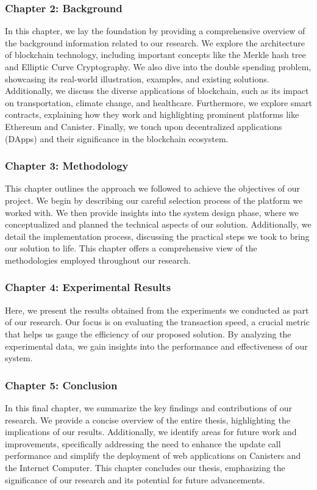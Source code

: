 \subsubsection{Chapter 2: Background}
In this chapter, we lay the foundation by providing a comprehensive overview of the background information related to our research. We explore the architecture of blockchain technology, including important concepts like the Merkle hash tree and Elliptic Curve Cryptography. We also dive into the double spending problem, showcasing its real-world illustration, examples, and existing solutions. Additionally, we discuss the diverse applications of blockchain, such as its impact on transportation, climate change, and healthcare. Furthermore, we explore smart contracts, explaining how they work and highlighting prominent platforms like Ethereum and Canister. Finally, we touch upon decentralized applications (DApps) and their significance in the blockchain ecosystem.

\subsubsection{Chapter 3: Methodology}
This chapter outlines the approach we followed to achieve the objectives of our project. We begin by describing our careful selection process of the platform we worked with. We then provide insights into the system design phase, where we conceptualized and planned the technical aspects of our solution. Additionally, we detail the implementation process, discussing the practical steps we took to bring our solution to life. This chapter offers a comprehensive view of the methodologies employed throughout our research.

\subsubsection{Chapter 4: Experimental Results}
Here, we present the results obtained from the experiments we conducted as part of our research. Our focus is on evaluating the transaction speed, a crucial metric that helps us gauge the efficiency of our proposed solution. By analyzing the experimental data, we gain insights into the performance and effectiveness of our system.

\subsubsection{Chapter 5: Conclusion}
In this final chapter, we summarize the key findings and contributions of our research. We provide a concise overview of the entire thesis, highlighting the implications of our results. Additionally, we identify areas for future work and improvements, specifically addressing the need to enhance the update call performance and simplify the deployment of web applications on Canisters and the Internet Computer. This chapter concludes our thesis, emphasizing the significance of our research and its potential for future advancements.